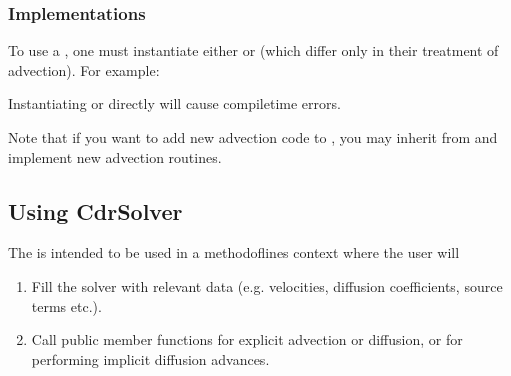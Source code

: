\documentclass[letterpaper,10pt,english]{sphinxmanual}
\begin{document}
\subsubsection{Implementations}
\label{\detokenize{Solvers/CDR:implementations}}
To use a , one must instantiate either  or  (which differ only in their treatment of advection).
For example:

\begin{sphinxVerbatim}[commandchars=\\\{\},formatcom=\scriptsize]
     
      

\end{sphinxVerbatim}

Instantiating  or  directly will cause compile\sphinxhyphen{}time errors.

Note that if you want to add new advection code to , you may inherit from  and implement new advection routines.


\subsection{Using CdrSolver}
\label{\detokenize{Solvers/CDR:using-cdrsolver}}
The  is intended to be used in a method\sphinxhyphen{}of\sphinxhyphen{}lines context where the user will
\begin{enumerate}
%
\item {} 
Fill the solver with relevant data (e.g. velocities, diffusion coefficients, source terms etc.).

\item {} 
Call public member functions for explicit advection or diffusion, or for performing implicit diffusion advances.

\end{enumerate}
\end{document}
